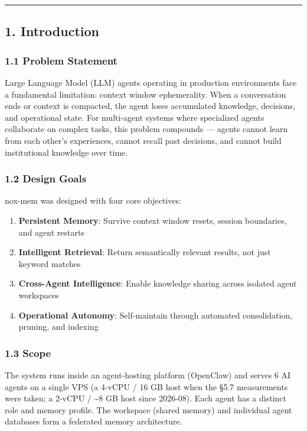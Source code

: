 \documentclass[
]{article}
\providecommand{\tightlist}{%
  \setlength{\itemsep}{0pt}\setlength{\parskip}{0pt}}
\begin{document}
\begin{center}\rule{0.5\linewidth}{0.5pt}\end{center}

\subsection{1. Introduction}\label{introduction}

\subsubsection{1.1 Problem Statement}\label{problem-statement}

Large Language Model (LLM) agents operating in production environments
face a fundamental limitation: context window ephemerality. When a
conversation ends or context is compacted, the agent loses accumulated
knowledge, decisions, and operational state. For multi-agent systems
where specialized agents collaborate on complex tasks, this problem
compounds --- agents cannot learn from each other's experiences, cannot
recall past decisions, and cannot build institutional knowledge over
time.

\subsubsection{1.2 Design Goals}\label{design-goals}

nox-mem was designed with four core objectives:

\begin{enumerate}
\def\labelenumi{\arabic{enumi}.}
\tightlist
\item
  \textbf{Persistent Memory}: Survive context window resets, session
  boundaries, and agent restarts
\item
  \textbf{Intelligent Retrieval}: Return semantically relevant results,
  not just keyword matches
\item
  \textbf{Cross-Agent Intelligence}: Enable knowledge sharing across
  isolated agent workspaces
\item
  \textbf{Operational Autonomy}: Self-maintain through automated
  consolidation, pruning, and indexing
\end{enumerate}

\subsubsection{1.3 Scope}\label{scope}

The system runs inside an agent-hosting platform (OpenClaw) and serves 6
AI agents on a single VPS (a 4-vCPU / 16 GB host when the §5.7
measurements were taken; a 2-vCPU / \textasciitilde8 GB host since
2026-08). Each agent has a distinct role and memory profile. The
workspace (shared memory) and individual agent databases form a
federated memory architecture.
\end{document}
